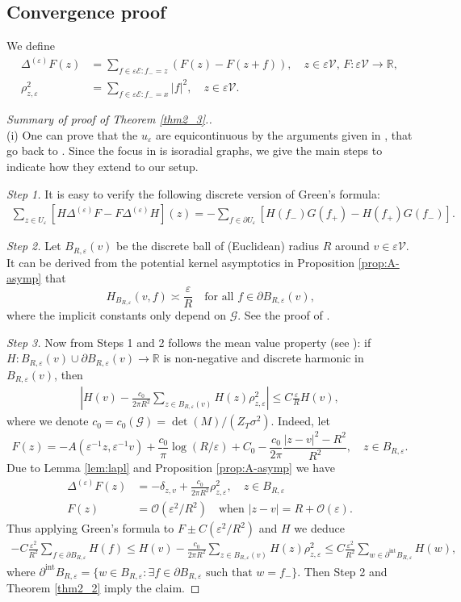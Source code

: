 \documentclass[11pt]{article}
\theoremstyle{remark}
\def\eps{\varepsilon}
\def\cG{\mathcal{G}}
\def\cV{\mathcal{V}}
\def\cE{\mathcal{E}}
\newcommand{\eqnst}[1]{\begin{equation*}#1\end{equation*}}
\newcommand{\eqnsplst}[1]{\begin{equation*}\begin{split}%
   #1\end{split}\end{equation*}}
\begin{document}
\subsection{Convergence proof}
\label{ssec:convergence-proof}

We define
\eqnsplst{
  \Delta^{(\eps)} F(z)
  &= \sum_{f \in \eps \cE: f_- = z} (F(z) - F(z+f)), \quad z \in \eps\cV,\, F : \eps \cV \to \mathbb{R}, \\
  \rho^2_{z,\eps}
  &= \sum_{f \in \eps\cE: f_- = x} |f|^2, \quad z \in \eps\cV. }

\begin{proof}[Summary of proof of Theorem \ref{thm2_3}.] \ \\ 
(i) One can prove that the $u_\eps$ are equicontinuous by the arguments 
given in \cite[Appendix]{CS11}, that go back to \cite{D53,B08}. Since the 
focus in \cite{CS11} is isoradial graphs, we give the main steps to 
indicate how they extend to our setup.

\emph{Step 1.} It is easy to verify the following discrete version of Green's formula:
\eqnsplst{
  \sum_{z \in U_\eps} \left[ H \Delta^{(\eps)} F - F \Delta^{(\eps)} H \right](z) 
  = - \sum_{f \in \partial U_\eps}
    \left[ H(f_-) G(f_+) - H(f_+) G(f_-) \right]. }

\emph{Step 2.} Let $B_{R,\eps}(v)$ be the discrete ball of (Euclidean) radius 
$R$ around $v \in \eps\cV$. It can be derived from the potential kernel asymptotics 
in Proposition \ref{prop:A-asymp} that
\eqnst{
  H_{B_{R,\eps}}(v,f) 
  \asymp \frac{\eps}{R} \quad \text{for all $f \in \partial B_{R,\eps}(v)$,} }
where the implicit constants only depend on $\cG$. See the proof 
of \cite[Proposition A.1]{CS11}.

\emph{Step 3.} Now from Steps 1 and 2 follows the mean value property 
(see \cite[Proposition A.2]{CS11}): 
if $H : B_{R,\eps}(v) \cup \partial B_{R,\eps}(v) \to \mathbb{R}$ is non-negative 
and discrete harmonic in $B_{R,\eps}(v)$, then
\eqnsplst{
 \left| H(v) - \frac{c_0}{2 \pi R^2} \sum_{z \in B_{R,\eps}(v)} H(z) \rho^2_{z,\eps} \right|
 \le C \frac{\eps}{R} H(v), }
where we denote $c_0 = c_0(\cG) = \det(M)/(Z_T \sigma^2)$. Indeed, let
\[ F(z)
   = - A(\eps^{-1} z, \eps^{-1} v) + \frac{c_0}{\pi} \log (R/\eps) + C_0 
     - \frac{c_0}{2\pi} \frac{|z-v|^2 - R^2}{R^2}, \quad z\in B_{R,\eps}. \]
Due to Lemma \ref{lem:lapl} and Proposition \ref{prop:A-asymp} we have 
\eqnsplst{
  \Delta^{(\eps)} F (z)
  &= - \delta_{z,v} + \frac{c_0}{2 \pi R^2} \rho^2_{z,\eps}, \quad z \in B_{R,\eps} \\
  F(z) 
  &= \mathcal{O}(\eps^2/R^2) \quad \text{when $|z-v| = R + \mathcal{O}(\eps)$}. }
Thus applying Green's formula to $F \pm C (\eps^2/R^2)$ and $H$ we deduce
\eqnsplst{
 -C \frac{\eps^2}{R^2} \sum_{f \in \partial B_{R,\eps}} H(f) 
 \le H(v) - \frac{c_0}{2 \pi R^2} \sum_{z \in B_{R,\eps}(v)} H(z) \rho^2_{z,\eps}
 \le C \frac{\eps^2}{R^2} \sum_{w \in \partial^{\mathrm{int}} B_{R,\eps}} H(w), }
where $\partial^{\mathrm{int}} B_{R,\eps}
= \{ w \in B_{R,\eps} : \text{$\exists f \in \partial B_{R,\eps}$ such that $w = f_-$}\}$.
Then Step 2 and Theorem \ref{thm2_2} imply the claim.


\end{proof}
\end{document}
